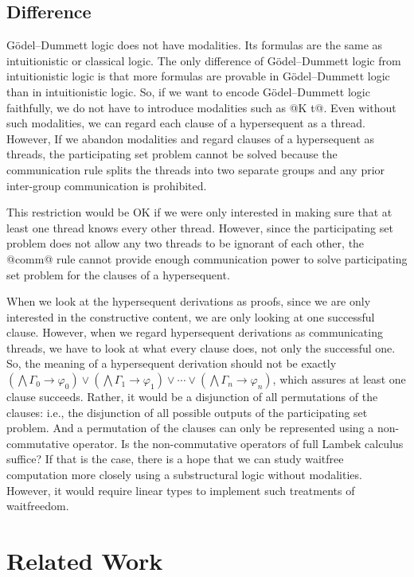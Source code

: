 \documentclass[doctor]{iscs-thesis}
\begin{document}
\subsection{Difference}

G\"odel--Dummett logic does not have modalities.  Its formulas are the
same as intuitionistic or classical logic.  The only difference of
G\"odel--Dummett logic from intuitionistic logic is that more formulas
are provable in G\"odel--Dummett
logic than in intuitionistic logic.  So, if we want to encode G\"odel--Dummett
logic faithfully, we do not have to introduce modalities such as @K t@.
Even without such modalities, we can regard each clause of a
hypersequent as a thread. However, 
If we abandon modalities and regard clauses of a hypersequent as
threads, the participating set problem cannot be solved because the communication rule
splits the threads into two separate groups and any prior
inter-group communication is prohibited.

This restriction would be OK if we were only interested in making sure that
at least one thread knows every other thread.  However, since the
participating set problem does not allow any two threads to be ignorant
of each other, the @comm@ rule cannot provide enough communication power
to solve participating set problem for the clauses of a hypersequent.

When we look at the hypersequent derivations as proofs, since we are only
interested in the constructive content, we are only looking at one
successful clause.  However, when we regard hypersequent derivations as
communicating threads, we have to look at what every clause does, not
only the successful one.  So, the meaning of a hypersequent derivation
should not be exactly
$\left(\bigwedge\Gamma_0\rightarrow\varphi_0\right)\vee\left(\bigwedge\Gamma_1\rightarrow\varphi_1\right)\vee\cdots\vee\left(\bigwedge
\Gamma_n\rightarrow\varphi_n\right)$, which assures at least one clause
succeeds.
Rather, it would be a disjunction of all permutations of the clauses:
i.e., the disjunction of all possible outputs of the participating set problem.
And a permutation of the clauses can only be represented using a
non-commutative operator.  Is the non-commutative operators of
full Lambek calculus suffice?  If that is the case, there is a hope that
we can study
waitfree computation more closely using a substructural logic without
modalities.
However, it would require linear types to implement such treatments of
waitfreedom.

\section{Related Work}
\end{document}
